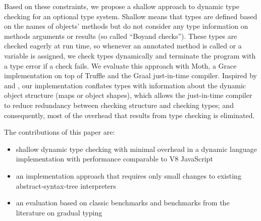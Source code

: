 Based on these constraints,
we propose a shallow approach to dynamic type checking
for an optional type system.
Shallow means that types are defined based on the names of objects' methods
but do not consider any type information on methods arguments or results (so
called ``Boyand checks''\citep{Boyland2014}).
These types are checked eagerly at run time, so whenever 
an annotated method is called or a variable is assigned,
we check types dynamically and terminate the program with a type error
if a check fails. We evaluate this approach with Moth,
a Grace implementation on top of Truffle
and the Graal just-in-time compiler\citep{Wurthinger2013,Wurthinger:2017:PPE}.
Inspired by \citet{Richards2017} and \citet{Bauman2017},
our implementation conflates types
with information about the dynamic object structure 
(maps\citep{Self} or object shapes\citep{woss2014object}), 
which allows the just-in-time compiler
to reduce redundancy between checking structure
and checking types; and consequently, most of the overhead 
that results from type checking is eliminated.



The contributions of this paper are:

\begin{itemize}
\item shallow dynamic type checking with minimal overhead
      in a dynamic language implementation
      with performance comparable to V8 JavaScript
\item an implementation approach that requires
      only small changes to existing abstract-syntax-tree interpreters
\item an evaluation based on classic benchmarks
      and benchmarks from the literature on gradual typing
\end{itemize}
